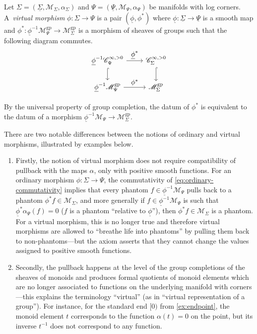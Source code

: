 \documentclass[JEP,XML,SOM,Unicode,NoFloatCountersInSection,published]{cedram}
\let\tst\textstyle
\theoremstyle{definition}
\theoremstyle{remark}
\newenvironment{remark}
  {\pushQED{\qed}\renewcommand{\qedsymbol}{$\lozenge$}\remarkx}
  {\popQED\endremarkx}
\let\defn\emph
\newcommand{\cM}{\mathscr{M}}
\newcommand{\cMgp}{\mathscr{M}^{\mathrm{gp}}}
\newcommand{\Cinfpos}[1]{\mathscr{C}^{\infty, > 0}_{#1}}
\newcommand{\Sig}{\Sigma}
\newcommand{\uSig}{\underline{\Sigma}}
\newcommand{\uphi}{\underline{\phi}}
\newcommand{\uPsi}{\underline{\Psi}}
\begin{document}
\begin{definition}\label{def:weak-morph}
Let $\Sig = (\uSig,\cM_\Sig,\alpha_\Sig)$ and $\Psi = (\uPsi,\cM_\Psi,\alpha_\Psi)$ be manifolds with log corners. A~\defn{virtual morphism} $\phi\colon\Sig\to \Psi$ is a pair $(\underline{\phi},\phi^*)$ where $\underline{\phi}\colon \uSig \to \uPsi$ is a smooth map and $\phi^*\colon \underline{\phi}^{-1}\cMgp_\Psi \to \cMgp_\Sig$ is a morphism of sheaves of groups such that the following diagram commutes.
\[
\begin{tikzcd}
\uphi^{-1}\Cinfpos{\Psi} \ar[r,"\tst \uphi^*"] \ar[d,hook] & \Cinfpos{\Sig} \ar[d,hook] \\
\uphi^{-1}\cMgp_{\Psi} \ar[r,"\tst \phi^*"] & \cMgp_{\Sig}
\end{tikzcd}
\]
\end{definition}

\begin{remark}
By the universal property of group completion, the datum of $\phi^*$ is equivalent to the datum of a morphism $\uphi^{-1}\cM_\Psi \to \cMgp_\Sig$.
\end{remark}

There are two notable differences between the notions of ordinary and virtual morphisms, illustrated by examples below.
\begin{enumerate}
\item Firstly, the notion of virtual morphism does not require compatibility of pullback with the maps $\alpha$, only with positive smooth functions. For an ordinary morphism $\phi \colon \Sig \to \Psi$, the commutativity of \eqref{eq:ordinary-commutativity} implies that every phantom $f \in \uphi^{-1}\cM_\Psi$ pulls back to a phantom $\phi^*f \in \cM_\Sig$, and more generally if $f \in \uphi^{-1}\cM_\Psi$ is such that $\uphi^*\alpha_\Psi(f)= 0$ (\ie $f$ is a phantom ``relative to $\uphi$''), then $\phi^*f\in\cM_\Sig$ is a phantom. For a virtual morphism, this is no longer true and therefore virtual morphisms are allowed to ``breathe life into phantoms'' by pulling them back to non-phantoms---but the axiom asserts that they cannot change the values assigned to positive smooth functions.
\item Secondly, the pullback happens at the level of the group completions of the sheaves of monoids and produces formal quotients of monoid elements which are no longer associated to functions on the underlying manifold with corners---this explains the terminology ``virtual'' (as in ``virtual representation of a group''). For instance, for the standard end $[0)$ from \autoref{ex:endpoint}, the monoid element $t$ corresponds to the function $\alpha(t)=0$ on the point, but its inverse $t^{-1}$ does not correspond to any function.
\end{enumerate}
\end{document}
